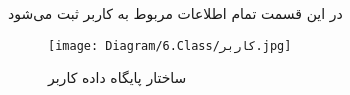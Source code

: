 در این قسمت تمام اطلاعات مربوط به کاربر ثبت می‌شود

\begin{figure}[H]
	\texttt{[image: Diagram/6.Class/کاربر.jpg]}
	\centering
	\caption{ساختار پایگاه داده کاربر}
	\label{fig:db:کاربر}
\end{figure}
